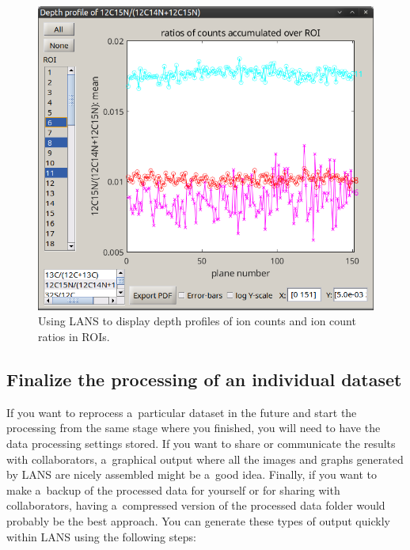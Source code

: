 \begin{figure}[!ht]
\centering
\includegraphics[scale=0.4]{figs3/LANS-depth-profiles}
\caption{\label{fig:depth-profiles}%
Using LANS to display depth profiles of ion counts and ion count ratios in ROIs.}
\end{figure}



\subsection{Finalize the processing of an individual dataset}
\label{sec:final-steps}
\setcounter{step}{0}

\goldbox{}
If you want to reprocess a~particular dataset in the future and start the processing from the same stage where you finished, you will need to have the data processing settings stored. If you want to share or communicate the results with collaborators, a~graphical output where all the images and graphs generated by LANS are nicely assembled might be a~good idea. Finally, if you want to make a~backup of the processed data for yourself or for sharing with collaborators, having a~compressed version of the processed data folder would probably be the best approach. You can generate these types of output quickly within LANS using the following steps:
\tcbe

